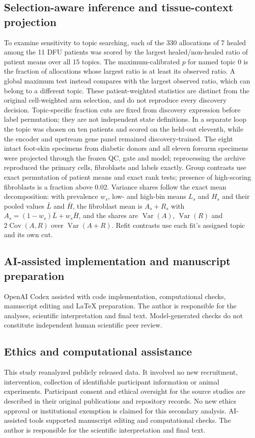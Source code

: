 \documentclass[10pt,a4paper]{article}
\begin{document}
\subsection{Selection-aware inference and tissue-context projection}
To examine sensitivity to topic searching, each of the 330 allocations of 7 healed among the 11 DFU patients was scored by the largest healed/non-healed ratio of patient means over all 15 topics. The maximum-calibrated $p$ for named topic 0 is the fraction of allocations whose largest ratio is at least its observed ratio. A global maximum test instead compares with the largest observed ratio, which can belong to a different topic. These patient-weighted statistics are distinct from the original cell-weighted arm selection, and do not reproduce every discovery decision. Topic-specific fraction cuts are fixed from discovery expression before label permutation; they are not independent state definitions. In a separate loop the topic was chosen on ten patients and scored on the held-out eleventh, while the encoder and upstream gene panel remained discovery-trained. The eight intact foot-skin specimens from diabetic donors and all eleven forearm specimens were projected through the frozen QC, gate and model; reprocessing the archive reproduced the primary cells, fibroblasts and labels exactly. Group contrasts use exact permutation of patient means and exact rank tests; presence of high-scoring fibroblasts is a fraction above 0.02. Variance shares follow the exact mean decomposition: with prevalence $w_s$, low- and high-bin means $L_s$ and $H_s$ and their pooled values $\bar L$ and $\bar H$, the fibroblast mean is $A_s+R_s$ with $A_s=(1-w_s)\bar L+w_s\bar H$, and the shares are $\operatorname{Var}(A)$, $\operatorname{Var}(R)$ and $2\operatorname{Cov}(A,R)$ over $\operatorname{Var}(A+R)$. Refit contrasts use each fit's assigned topic and its own cut.

\subsection{AI-assisted implementation and manuscript preparation}
OpenAI Codex assisted with code implementation, computational checks, manuscript editing and LaTeX preparation. The author is responsible for the analyses, scientific interpretation and final text. Model-generated checks do not constitute independent human scientific peer review.


\subsection{Ethics and computational assistance}
This study reanalyzed publicly released data. It involved no new recruitment, intervention, collection of identifiable participant information or animal experiments. Participant consent and ethical oversight for the source studies are described in their original publications and repository records. No new ethics approval or institutional exemption is claimed for this secondary analysis.
AI-assisted tools supported manuscript editing and computational checks. The author is responsible for the scientific interpretation and final text.
\end{document}
